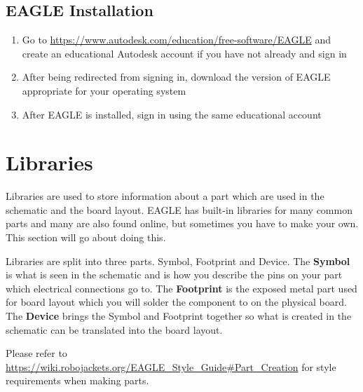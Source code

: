 \documentclass{article}
\begin{document}
\subsection{EAGLE Installation}
\begin{enumerate}
    \item Go to \url{https://www.autodesk.com/education/free-software/EAGLE} and create an educational Autodesk account if you have not already and sign in
    \item After being redirected from signing in, download the version of EAGLE appropriate for your operating system
    \item After EAGLE is installed, sign in using the same educational account 
\end{enumerate}

\section{Libraries}
Libraries are used to store information about a part which are used in the schematic and the board layout. EAGLE has built-in libraries for many common parts and many are also found online, but sometimes you have to make your own. This section will go about doing this. \par
Libraries are split into three parts. Symbol, Footprint and Device. The \textbf{Symbol} is what is seen in the schematic and is how you describe the pins on your part which electrical connections go to. The \textbf{Footprint} is the exposed metal part used for board layout which you will solder the component to on the physical board. The \textbf{Device} brings the Symbol and Footprint together so what is created in the schematic can be translated into the board layout. \par
Please refer to \url{https://wiki.robojackets.org/EAGLE_Style_Guide#Part_Creation} for style requirements when making parts.
\end{document}

